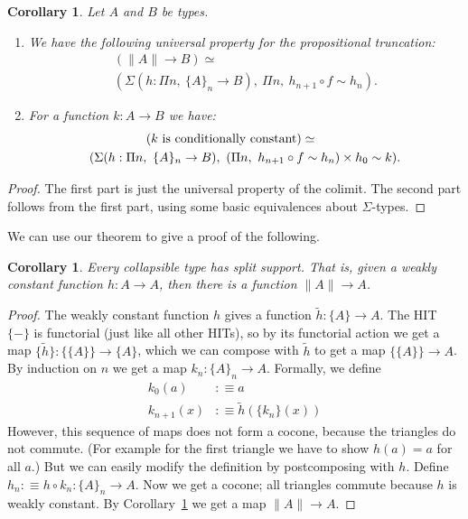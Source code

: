 \documentclass[square]{sigplanconf}
\newcommand{\fax}[2]{\ensuremath{\Pi#1,\ #2}}
\newcommand{\ex}[2]{\ensuremath{\Sigma(#1),\ #2}}
\newtheorem{corollary}[theorem]{Corollary}
\theoremstyle{definition}
\theoremstyle{remark}
\begin{document}
\begin{corollary}\label{c:universal} Let $A$ and $B$ be types.
\begin{enumerate}
\item We have the following universal property for the propositional truncation:
\begin{gather*}
  (\|A\|\to B)\simeq\qquad\mbox{}\\
  (\ex{h:\fax{n}{\{A\}_n\to B}}{\fax{n}{h_{n+1}\circ f \sim h_n}}).
\end{gather*}

\item For a function $k: A \to B$ we have:
\begin{gather*}
  (k\textup{ is conditionally constant})\simeq\qquad\mbox{}\\
  (\ex{h:\fax{n}{\{A\}_n\to B}}{(\fax{n}{h_{n+1}\circ f\sim h_n})\times h_0\sim k}).
\end{gather*}
\end{enumerate}
\end{corollary}
\begin{proof}
The first part is just the universal property of the colimit. The second part follows from the first
part, using some basic equivalences about $\Sigma$-types.
\end{proof}

We can use our theorem to give a proof of the following.
\begin{corollary}\label{c:hstable}
Every \emph{collapsible} type \emph{has split support}. That is, given a weakly constant function $h
: A \to A$, then there is a function $\|A\|\to A$.
\end{corollary}
\begin{proof}
The weakly constant function $h$ gives a function $\tilde h : \{A\}\to A$. The HIT $\{{-}\}$ is
functorial (just like all other HITs), so by its functorial action we get a map $\{\tilde
h\}:\{\{A\}\}\to\{A\}$, which we can compose with $\tilde h$ to get a map $\{\{A\}\}\to A$. By
induction on $n$ we get a map $k_n : \{A\}_n \to A$. Formally, we define
\begin{align*}
k_0(a)&:\equiv a\\ k_{n+1}(x)&:\equiv \tilde h(\{k_n\}(x))
\end{align*}
However, this sequence of maps does not form a cocone, because the triangles do not commute. (For
example for the first triangle we have to show $h(a)=a$ for all $a$.) But we can easily modify the
definition by postcomposing with $h$. Define $h_n:\equiv h\circ k_n : \{A\}_n\to A$. Now we get a
cocone; all triangles commute because $h$ is weakly constant. By Corollary~\ref{c:universal} we get
a map $\|A\|\to A$.
\end{proof}
\end{document}
